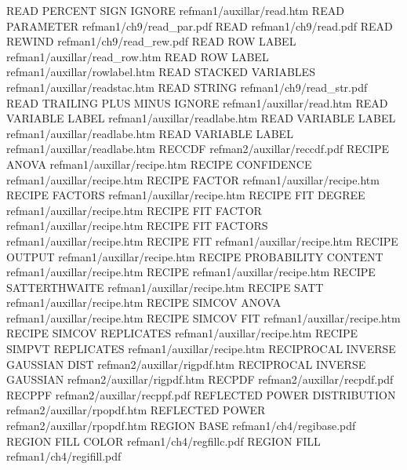 READ PERCENT SIGN IGNORE                refman1/auxillar/read.htm
READ PARAMETER                          refman1/ch9/read_par.pdf
READ                                    refman1/ch9/read.pdf
READ REWIND                             refman1/ch9/read_rew.pdf
READ ROW LABEL                          refman1/auxillar/read_row.htm
READ ROW LABEL                          refman1/auxillar/rowlabel.htm
READ STACKED VARIABLES                  refman1/auxillar/readstac.htm
READ STRING                             refman1/ch9/read_str.pdf
READ TRAILING PLUS MINUS IGNORE         refman1/auxillar/read.htm
READ VARIABLE LABEL                     refman1/auxillar/readlabe.htm
READ VARIABLE LABEL                     refman1/auxillar/readlabe.htm
READ VARIABLE LABEL                     refman1/auxillar/readlabe.htm
RECCDF                                  refman2/auxillar/reccdf.pdf
RECIPE ANOVA                            refman1/auxillar/recipe.htm
RECIPE CONFIDENCE                       refman1/auxillar/recipe.htm
RECIPE FACTOR                           refman1/auxillar/recipe.htm
RECIPE FACTORS                          refman1/auxillar/recipe.htm
RECIPE FIT DEGREE                       refman1/auxillar/recipe.htm
RECIPE FIT FACTOR                       refman1/auxillar/recipe.htm
RECIPE FIT FACTORS                      refman1/auxillar/recipe.htm
RECIPE FIT                              refman1/auxillar/recipe.htm
RECIPE OUTPUT                           refman1/auxillar/recipe.htm
RECIPE PROBABILITY CONTENT              refman1/auxillar/recipe.htm
RECIPE                                  refman1/auxillar/recipe.htm
RECIPE SATTERTHWAITE                    refman1/auxillar/recipe.htm
RECIPE SATT                             refman1/auxillar/recipe.htm
RECIPE SIMCOV ANOVA                     refman1/auxillar/recipe.htm
RECIPE SIMCOV FIT                       refman1/auxillar/recipe.htm
RECIPE SIMCOV REPLICATES                refman1/auxillar/recipe.htm
RECIPE SIMPVT REPLICATES                refman1/auxillar/recipe.htm
RECIPROCAL INVERSE GAUSSIAN DIST        refman2/auxillar/rigpdf.htm
RECIPROCAL INVERSE GAUSSIAN             refman2/auxillar/rigpdf.htm
RECPDF                                  refman2/auxillar/recpdf.pdf
RECPPF                                  refman2/auxillar/recppf.pdf
REFLECTED POWER DISTRIBUTION            refman2/auxillar/rpopdf.htm
REFLECTED POWER                         refman2/auxillar/rpopdf.htm
REGION BASE                             refman1/ch4/regibase.pdf
REGION FILL COLOR                       refman1/ch4/regfillc.pdf
REGION FILL                             refman1/ch4/regifill.pdf
